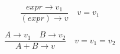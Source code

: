 \[ \frac{expr \rightarrow v_1}{(expr) \rightarrow v} \quad v = v_1 \]

\[ \frac{A \rightarrow v_1 \quad B \rightarrow v_2}{A + B \rightarrow v} \quad v = v_1 = v_2 \]